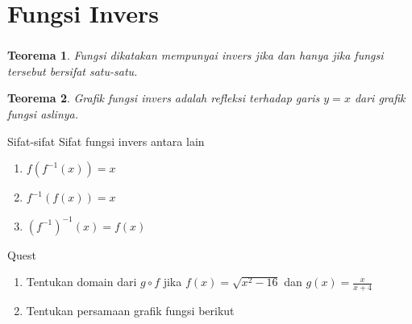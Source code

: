 \documentclass[aspectratio=169]{beamer}
\newtheorem{teorema}{Teorema}
\theoremstyle{definition}
\begin{document}
\section{Fungsi Invers}
\begin{frame}
    \frametitle{\insertsection}
    \begin{teorema}
        Fungsi dikatakan mempunyai invers jika dan hanya jika fungsi tersebut bersifat satu-satu.
    \end{teorema}
    \begin{teorema}
        Grafik fungsi invers adalah refleksi terhadap garis $y=x$ dari grafik fungsi aslinya.
    \end{teorema}
    \begin{block}{Sifat-sifat}
        Sifat fungsi invers antara lain
        \begin{enumerate}[label=(\arabic*)]
            \item $\displaystyle f(f^{-1}(x))=x$
            \item $\displaystyle f^{-1}(f(x))=x$
            \item $\displaystyle (f^{-1})^{-1}(x)=f(x)$
        \end{enumerate}
    \end{block}
\end{frame}

{
\begin{frame}
    \begin{block}{\huge Quest}
        \begin{enumerate} [label=(\arabic*)]
            \item Tentukan domain dari $g\circ f$ jika $f(x)=\sqrt{x^2-16}$ dan $\displaystyle g(x)=\frac{x}{x+4}$
            \item Tentukan persamaan grafik fungsi berikut
        \end{enumerate}
    \end{block}
\end{frame}}
\end{document}

